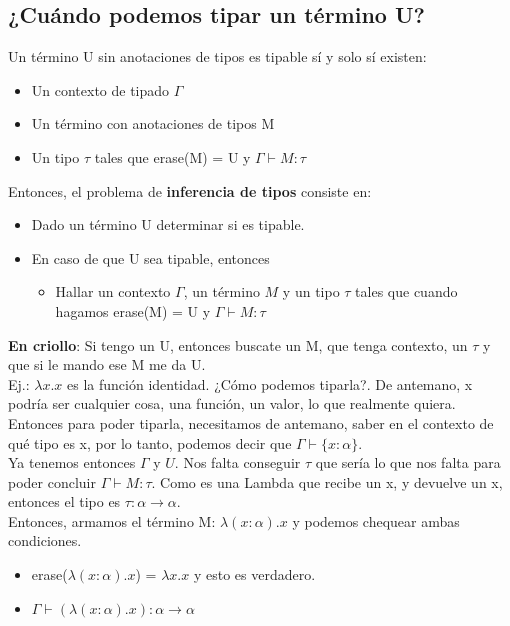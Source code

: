 \documentclass[10pt,a4paper]{article}
\begin{document}
\subsection*{¿Cuándo podemos tipar un término U?}
Un término U sin anotaciones de tipos es tipable sí y solo sí existen: 
\begin{itemize}
    \item Un contexto de tipado $\Gamma$
    \item Un término con anotaciones de tipos M 
    \item Un tipo $\tau$
    tales que erase(M) = U y $\Gamma \vdash M:\tau$
\end{itemize}
Entonces, el problema de \textbf{inferencia de tipos} consiste en: 
\begin{itemize}
    \item Dado un término U determinar si es tipable.
    \item En caso de que U sea tipable, entonces
    \begin{itemize}
        \item Hallar un contexto $\Gamma$, un término $M$ y un tipo $\tau$ tales que cuando hagamos erase(M) = U y $\Gamma \vdash M:\tau$
    \end{itemize}
\end{itemize}
\textbf{En criollo}: Si tengo un U, entonces buscate un M, que tenga contexto, un $\tau$ y que si le mando ese M me da U. \\
Ej.: $\lambda x . x$ es la función identidad. ¿Cómo podemos tiparla?. De antemano, x podría ser cualquier cosa, una función, un valor, lo que realmente quiera. \\
Entonces para poder tiparla, necesitamos de antemano, saber en el contexto de qué tipo es x, por lo tanto, podemos decir que $\Gamma \vdash \{x: \alpha\}$. \\
Ya tenemos entonces $\Gamma$ y $U$. Nos falta conseguir $\tau$ que sería lo que nos falta para poder concluir $\Gamma \vdash M:\tau$. Como es una Lambda que recibe un x, y devuelve un x, entonces el tipo es $\tau:\alpha \rightarrow \alpha$. \\
Entonces, armamos el término M: $\lambda(x:\alpha) . x$ y podemos chequear ambas condiciones.
\begin{itemize}
    \item erase($\lambda(x:\alpha) . x$) = $\lambda x . x$ y esto es verdadero.
    \item $\Gamma \vdash (\lambda(x:\alpha) . x):\alpha \rightarrow \alpha$
\end{itemize}
\end{document}
